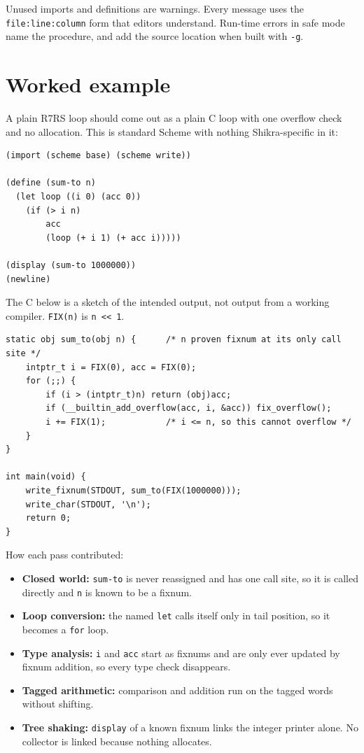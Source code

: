 \documentclass[a4paper,11pt]{article}
\begin{document}
Unused imports and definitions are warnings. Every message uses the
\texttt{file:line:column} form that editors understand. Run-time errors in
safe mode name the procedure, and add the source location when built with
\texttt{-g}.

\section{Worked example}

A plain R7RS loop should come out as a plain C loop with one overflow check
and no allocation. This is standard Scheme with nothing Shikra-specific in
it:

\begin{verbatim}
(import (scheme base) (scheme write))

(define (sum-to n)
  (let loop ((i 0) (acc 0))
    (if (> i n)
        acc
        (loop (+ i 1) (+ acc i)))))

(display (sum-to 1000000))
(newline)
\end{verbatim}

The C below is a sketch of the intended output, not output from a working
compiler. \texttt{FIX(n)} is \texttt{n << 1}.

\begin{verbatim}
static obj sum_to(obj n) {      /* n proven fixnum at its only call site */
    intptr_t i = FIX(0), acc = FIX(0);
    for (;;) {
        if (i > (intptr_t)n) return (obj)acc;
        if (__builtin_add_overflow(acc, i, &acc)) fix_overflow();
        i += FIX(1);            /* i <= n, so this cannot overflow */
    }
}

int main(void) {
    write_fixnum(STDOUT, sum_to(FIX(1000000)));
    write_char(STDOUT, '\n');
    return 0;
}
\end{verbatim}

How each pass contributed:

\begin{itemize}
\item \textbf{Closed world:} \texttt{sum-to} is never reassigned and has one
  call site, so it is called directly and \texttt{n} is known to be a
  fixnum.
\item \textbf{Loop conversion:} the named \texttt{let} calls itself only in
  tail position, so it becomes a \texttt{for} loop.
\item \textbf{Type analysis:} \texttt{i} and \texttt{acc} start as fixnums
  and are only ever updated by fixnum addition, so every type check
  disappears.
\item \textbf{Tagged arithmetic:} comparison and addition run on the tagged
  words without shifting.
\item \textbf{Tree shaking:} \texttt{display} of a known fixnum links the
  integer printer alone. No collector is linked because nothing allocates.
\end{itemize}
\end{document}
